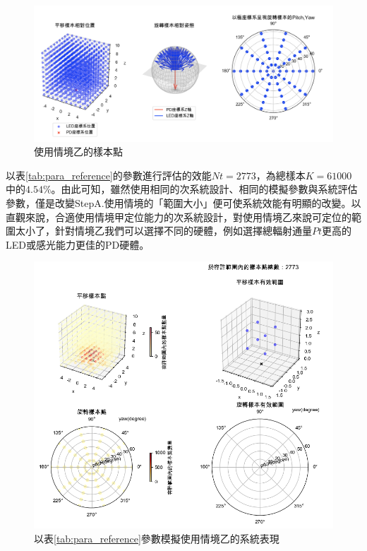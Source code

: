   

\begin{figure}[htpb]
    \centering
    \includegraphics[width=15cm]{ch4pic/b_scenario.png}
    \caption{使用情境乙的樣本點}
    \label{pic:b_scenario}
\end{figure}

以表\ref{tab:para_reference}的參數進行評估的效能$Nt=2773$，為總樣本$K=61000$中的$4.54\%$。由此可知，雖然使用相同的次系統設計、相同的模擬參數與系統評估參數，僅是改變StepA.使用情境的「範圍大小」便可使系統效能有明顯的改變。以直觀來說，合適使用情境甲定位能力的次系統設計，對使用情境乙來說可定位的範圍太小了，針對情境乙我們可以選擇不同的硬體，例如選擇總輻射通量$Pt$更高的LED或感光能力更佳的PD硬體。

\begin{figure}[htpb]
    \centering
    \includegraphics[width=15cm]{ch4pic/scene_b_solve.png}
    \caption{以表\ref{tab:para_reference}參數模擬使用情境乙的系統表現}
    \label{pic:scenario_b_solve}
\end{figure}



